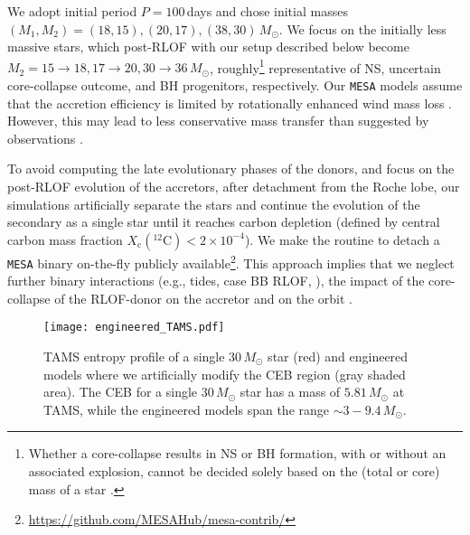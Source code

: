 \documentclass[twocolumn,twocolappendix,trackchanges]{aastex63}
\begin{document}
We adopt initial period $P=100$\,days and chose initial masses
$(M_{1}, M_{2}) = (18, 15), (20, 17), (38, 30)\,M_\odot$. We focus on
the initially less massive stars, which post-RLOF with our setup
described below become
$M_2=15\rightarrow 18, 17\rightarrow 20, 30\rightarrow 36\,M_\odot$, roughly\footnote{Whether a
  core-collapse results in NS or BH formation, with or without an
  associated explosion, cannot be decided solely based on the (total
  or core) mass of a star \citep[e.g.,][]{oconnor:11, farmer:16,
    patton:20, patton:22, zapartas:21b}. } representative of NS,
uncertain core-collapse outcome, and BH progenitors, respectively. Our \texttt{MESA} models
assume that the accretion efficiency is limited by rotationally
enhanced wind mass loss \citep[e.g.,][]{sravan:2019, wang:2020,
  renzo:2021zoph, sen:2022}. However, this may lead to less
conservative mass transfer than suggested by observations
\citep[e.g.,][]{wang:2021a}.

To avoid computing the late evolutionary phases of the donors, and
focus on the post-RLOF evolution of the accretors, after detachment
from the Roche lobe, our simulations artificially separate the
stars %
and continue the evolution of the secondary as a single star until it
reaches carbon depletion (defined by central carbon mass fraction
$X_\mathrm{c}(^{12}\mathrm{C})<2\times10^{-4} $). We make the routine
to detach a \texttt{MESA} binary on-the-fly publicly
available\footnote{\url{https://github.com/MESAHub/mesa-contrib/}}.
This approach implies that we neglect further binary interactions
(e.g., tides, case BB RLOF, \citealt{laplace:2020}), the impact of the
core-collapse of the RLOF-donor on the accretor \cite[e.g.,][]{hirai:2018,
  ogata:2021} and on the orbit \citep[e.g.,][]{brandt:1995,
  kalogera:1996, tauris:1998, renzo:2019walk}.


\begin{figure}[btp]
  \texttt{[image: engineered\_TAMS.pdf]}
  \caption{TAMS entropy profile of a single 30\,$M_\odot$ star (red)
    and engineered models where we artificially modify the
    CEB region (gray shaded area). The CEB for a single $30\,M_\odot$
    star has a mass of $5.81\,M_\odot$ at TAMS, while the engineered
    models span the range $\sim3-9.4\,M_\odot$.}
  \label{fig:engineered_TAMS}
\end{figure}
\end{document}
